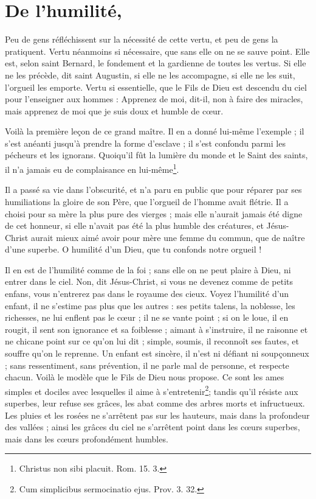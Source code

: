 \documentclass[instructions.tex]{subfiles}
\begin{document}
 
\chapter{De l’humilité,}
 
\primo Peu de gens réfléchissent sur la nécessité de cette vertu, et peu de gens la pratiquent. Vertu néanmoins si nécessaire, que sans elle on ne se sauve point. Elle est, selon saint Bernard, le fondement et la gardienne de toutes les vertus. Si elle ne les précède, dit saint Augustin, si elle ne les accompagne, si elle ne les suit, l’orgueil les emporte. Vertu si essentielle, que le Fils de Dieu est descendu du ciel pour l’enseigner aux hommes : Apprenez de moi, dit-il, non à faire des miracles, mais apprenez de moi que je suis doux et humble de cœur.
 
Voilà la première leçon de ce grand maître. Il en a donné lui-même l’exemple ; il s’est anéanti jusqu’à prendre la forme d’esclave ; il s’est confondu parmi les pécheurs et les ignorans. Quoiqu’il fût la lumière du monde et le Saint des saints, il n’a jamais eu de complaisance en lui-même\footnote{Christus non sibi placuit. Rom. 15. 3.}.
 
Il a passé sa vie dans l’obscurité, et n’a paru en public que pour réparer par ses humiliations la gloire de son Père, que l’orgueil de l’homme avait flétrie. Il a choisi pour sa mère la plus pure des vierges ; mais elle n’aurait jamais été digne de cet honneur, si elle n’avait pas été la plus humble des créatures, et Jésus-Christ aurait mieux aimé avoir pour mère une femme du commun, que de naître d’une superbe. O humilité d’un Dieu, que tu confonds notre orgueil !
 
Il en est de l’humilité comme de la foi ; sans elle on ne peut plaire à Dieu, ni entrer dans le ciel. Non, dit Jésus-Christ, si vous ne devenez comme de petits enfans, vous n’entrerez pas dans le royaume des cieux. Voyez l’humilité d’un enfant, il ne s’estime pas plus que les autres : ses petits talens, la noblesse, les richesses, ne lui enflent pas le cœur ; il ne se vante point ; si on le loue, il en rougit, il sent son ignorance et sa foiblesse ; aimant à s’instruire, il ne raisonne et ne chicane point sur ce qu’on lui dit ; simple, soumis, il reconnoît ses fautes, et souffre qu’on le reprenne. Un enfant est sincère, il n’est ni défiant ni soupçonneux ; sans ressentiment, sans prévention, il ne parle mal de personne, et respecte chacun. Voilà le modèle que le Fils de Dieu nous propose. Ce sont les ames simples et dociles avec lesquelles il aime à s’entretenir\footnote{Cum simplicibus sermocinatio ejus. Prov. 3. 32.}; tandis qu’il résiste aux superbes, leur refuse ses grâces, les abat comme des arbres morts et infructueux. Les pluies et les rosées ne s’arrêtent pas sur les hauteurs, mais dans la profondeur des vallées ; ainsi les grâces du ciel ne s’arrêtent point dans les cœurs superbes, mais dans les cœurs profondément humbles.
 
\end{document}
